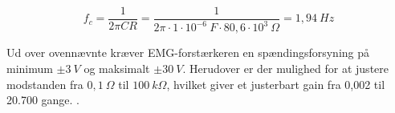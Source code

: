 \begin{equation}\label{eq:lavcutfre}
f_c = \frac{1}{2 \pi C R} = \frac{1}{2 \pi \cdot 1 \cdot 10^{-6}~F \cdot 80,6 \cdot 10^3~\Omega} = 1,94~Hz
\end{equation}

\noindent
Ud over ovennævnte kræver EMG-forstærkeren en spændingsforsyning på minimum $\pm 3~V$ og maksimalt $\pm 30~V$. Herudover er der mulighed for at justere modstanden fra $0,1~\Omega$ til $100~k\Omega$, hvilket giver et justerbart gain fra 0,002 til 20.700 gange. \citep{advancertech2013}. 